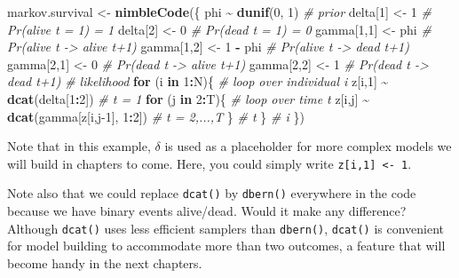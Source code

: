 \documentclass[
  12pt,
]{krantz}
\newenvironment{Shaded}{\begin{snugshade}}{\end{snugshade}}
\newcommand{\CommentTok}[1]{\textcolor[rgb]{0.56,0.35,0.01}{\textit{#1}}}
\newcommand{\ControlFlowTok}[1]{\textcolor[rgb]{0.13,0.29,0.53}{\textbf{#1}}}
\newcommand{\DecValTok}[1]{\textcolor[rgb]{0.00,0.00,0.81}{#1}}
\newcommand{\FunctionTok}[1]{\textcolor[rgb]{0.13,0.29,0.53}{\textbf{#1}}}
\newcommand{\NormalTok}[1]{#1}
\newcommand{\OtherTok}[1]{\textcolor[rgb]{0.56,0.35,0.01}{#1}}
\newcommand{\SpecialCharTok}[1]{\textcolor[rgb]{0.81,0.36,0.00}{\textbf{#1}}}
\begin{document}
\begin{Shaded}
\begin{Highlighting}[]
\NormalTok{markov.survival }\OtherTok{\textless{}{-}} \FunctionTok{nimbleCode}\NormalTok{(\{}
\NormalTok{  phi }\SpecialCharTok{\textasciitilde{}} \FunctionTok{dunif}\NormalTok{(}\DecValTok{0}\NormalTok{, }\DecValTok{1}\NormalTok{) }\CommentTok{\# prior}
\NormalTok{  delta[}\DecValTok{1}\NormalTok{] }\OtherTok{\textless{}{-}} \DecValTok{1}          \CommentTok{\# Pr(alive t = 1) = 1}
\NormalTok{  delta[}\DecValTok{2}\NormalTok{] }\OtherTok{\textless{}{-}} \DecValTok{0}          \CommentTok{\# Pr(dead t = 1) = 0}
\NormalTok{  gamma[}\DecValTok{1}\NormalTok{,}\DecValTok{1}\NormalTok{] }\OtherTok{\textless{}{-}}\NormalTok{ phi      }\CommentTok{\# Pr(alive t {-}\textgreater{} alive t+1)}
\NormalTok{  gamma[}\DecValTok{1}\NormalTok{,}\DecValTok{2}\NormalTok{] }\OtherTok{\textless{}{-}} \DecValTok{1} \SpecialCharTok{{-}}\NormalTok{ phi  }\CommentTok{\# Pr(alive t {-}\textgreater{} dead t+1)}
\NormalTok{  gamma[}\DecValTok{2}\NormalTok{,}\DecValTok{1}\NormalTok{] }\OtherTok{\textless{}{-}} \DecValTok{0}        \CommentTok{\# Pr(dead t {-}\textgreater{} alive t+1)}
\NormalTok{  gamma[}\DecValTok{2}\NormalTok{,}\DecValTok{2}\NormalTok{] }\OtherTok{\textless{}{-}} \DecValTok{1}        \CommentTok{\# Pr(dead t {-}\textgreater{} dead t+1)}
  \CommentTok{\# likelihood}
  \ControlFlowTok{for}\NormalTok{ (i }\ControlFlowTok{in} \DecValTok{1}\SpecialCharTok{:}\NormalTok{N)\{ }\CommentTok{\# loop over individual i}
\NormalTok{    z[i,}\DecValTok{1}\NormalTok{] }\SpecialCharTok{\textasciitilde{}} \FunctionTok{dcat}\NormalTok{(delta[}\DecValTok{1}\SpecialCharTok{:}\DecValTok{2}\NormalTok{]) }\CommentTok{\# t = 1}
    \ControlFlowTok{for}\NormalTok{ (j }\ControlFlowTok{in} \DecValTok{2}\SpecialCharTok{:}\NormalTok{T)\{ }\CommentTok{\# loop over time t}
\NormalTok{      z[i,j] }\SpecialCharTok{\textasciitilde{}} \FunctionTok{dcat}\NormalTok{(gamma[z[i,j}\DecValTok{{-}1}\NormalTok{], }\DecValTok{1}\SpecialCharTok{:}\DecValTok{2}\NormalTok{]) }\CommentTok{\# t = 2,...,T}
\NormalTok{    \} }\CommentTok{\# t}
\NormalTok{  \} }\CommentTok{\# i}
\NormalTok{\})}
\end{Highlighting}
\end{Shaded}

Note that in this example, \(\delta\) is used as a placeholder for more complex models we will build in chapters to come. Here, you could simply write \texttt{z{[}i,1{]}\ \textless{}-\ 1}.

Note also that we could replace \texttt{dcat()} by \texttt{dbern()} everywhere in the code because we have binary events alive/dead. Would it make any difference? Although \texttt{dcat()} uses less efficient samplers than \texttt{dbern()}, \texttt{dcat()} is convenient for model building to accommodate more than two outcomes, a feature that will become handy in the next chapters.
\end{document}
